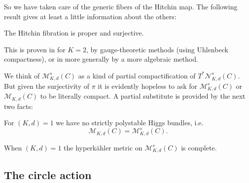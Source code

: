 \documentclass[12pt,letterpaper,reqno]{article}
\numberwithin{equation}{section}
\newcommand{\cB}{\ensuremath{\mathcal B}}
\newcommand{\cM}{\ensuremath{\mathcal M}}
\newcommand{\cN}{\ensuremath{\mathcal N}}
\newcommand{\hk}{hyperk\"ahler\xspace}
\newcommand{\fixme}[1]{{\color{orange}{[#1]}}}
\begin{document}
So we have taken care of the generic fibers of the Hitchin map.
The following result gives at least a little information about 
the others:

\begin{prop} The Hitchin fibration
is proper and surjective.
\end{prop}

\begin{pf} This is proven in \cite{MR89a:32021} for $K=2$,
by gauge-theoretic methods (using Uhlenbeck compactness),
or in \cite{MR1085642} more generally by a more algebraic
method.
\end{pf}

We think of $\cM_{K,d}^s(C)$ as a kind of partial compactification
of $T^* \cN_{K,d}^s(C)$. But given the surjectivity of $\pi$
it is evidently hopeless to ask for
$\cM^s_{K,d}(C)$ or $\cM_{K,d}(C)$ to be literally compact.
A partial substitute is provided by the next two facts:

\begin{prop}[$\cM = \cM^s$ when $(K,d)=1$] For
$(K,d) = 1$ we have no strictly polystable Higgs bundles, i.e.
\begin{equation}
 \cM_{K,d}(C) = \cM_{K,d}^s(C).   
\end{equation} 
\end{prop}

\begin{prop}[Completeness of \hk metric on $\cM_{K,d}^s(C)$ when $(K,d)=1$] When $(K,d) = 1$ the \hk metric on $\cM_{K,d}^s(C)$ is complete.
\end{prop}


\subsection{The circle action}

\fixme{...}



\printbibliography
\end{document}
